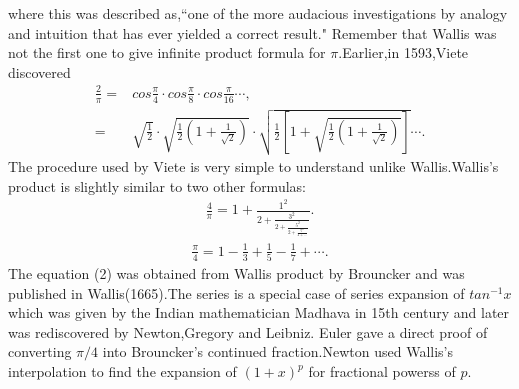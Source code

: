 \documentclass[a4paper,reqno,11pt]{book}
\theoremstyle{plain}%
\theoremstyle{definition}
\begin{document}
where this was described as,``one of the more audacious investigations by
 analogy and intuition that has ever yielded a correct result."
 \indent Remember that Wallis was not the first one to give infinite product formula for $\pi$.Earlier,in 1593,Viete discovered 
 \begin{align*}
     \frac{2}{\pi}=&cos\frac{\pi}{4}\cdot cos\frac{\pi}{8}\cdot cos\frac{\pi}{16}\cdots,\\
     =&\sqrt{\frac{1}{2}}\cdot\sqrt{\frac{1}{2}\left(1+\frac{1}{\sqrt{2}}\right)}\cdot \sqrt{\frac{1}{2}\left[1+\sqrt{\frac{1}{2}\left(1+\frac{1}{\sqrt{2}}\right)}\right]}\cdots.
 \end{align*}
The procedure used by Viete is very simple to understand unlike Wallis.Wallis's product is slightly similar to two other formulas:
\begin{align}
    \frac{4}{\pi}=1+\frac{1^2}{2+\frac{3^2}{2+\frac{5^2}{2+\frac{7^2}{2+\cdots}}}}.
\end{align}
\begin{align}
    \frac{\pi}{4}=1-\frac{1}{3}+\frac{1}{5}-\frac{1}{7}+\cdots.
\end{align}
The equation (2) was obtained from Wallis product by Brouncker and was published in Wallis(1665).The series is a special case of series expansion of $tan^{-1}x$ which was given by the Indian mathematician Madhava in 15th century and later was rediscovered by Newton,Gregory and Leibniz.
\indent Euler gave a direct proof of converting $\pi/4$ into Brouncker's continued fraction.Newton used Wallis's interpolation to find the expansion of $(1+x)^p$ for fractional powerss of $p$.
\end{document}
